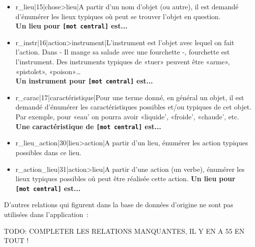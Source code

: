 \documentclass[a4paper,11pt,french]{article}
\begin{document}
\begin{itemize}
\item r\_lieu|15|chose>lieu|A partir d'un nom d'objet (ou autre), il est demandé d'énumérer les lieux typiques où peut se trouver l'objet en question. \\
{\bf Un lieu pour \verb![mot central]! est...} \\

\item r\_instr|16|action>instrument|L'instrument est l'objet avec lequel on fait l'action. Dans - Il mange sa salade avec une fourchette -, fourchette est l'instrument. Des instruments typiques de «tuer» peuvent être «arme», «pistolet», «poison»\dots{} \\
{\bf Un instrument pour \verb![mot central]! est...} \\

\item r\_carac|17|caractéristique|Pour une terme donné, en général un objet, il est demandé d'énumérer les caractéristiques possibles et/ou typiques de cet objet. Par exemple, pour «eau' on pourra avoir «liquide', «froide', «chaude', etc. \\
{\bf Une caractéristique de \verb![mot central]! est...}

\item r\_lieu\_action|30|lieu>action|A partir d'un lieu, énumérer les action typiques possibles dans ce lieu.

\item r\_action\_lieu|31|action>lieu|A partir d'une action (un verbe), énumérer les lieux typiques possibles où peut être réalisée cette action.
{\bf Un lieu pour \verb![mot central]! est...} \\

\end{itemize}

D'autres relations qui figurent dans la base de données d'origine ne sont pas utilisées dans l'application~:

TODO: COMPLETER LES RELATIONS MANQUANTES, IL Y EN A 55 EN TOUT !
\end{document}
